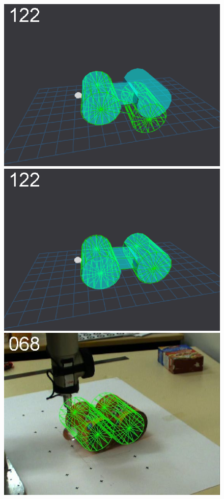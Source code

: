 \begin{figure}[tbp]
{\includegraphics[width=\imgCXwid]{images/C5_2exp_6_2}
\includegraphics[width=\imgCXwid]{images/C5_3exp_6_2}
\includegraphics[width=\imgCXwid]{images/C2_3exp_75_2}
}
\end{figure}

